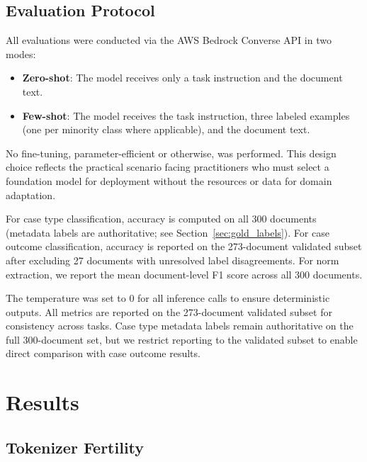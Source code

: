 \documentclass[11pt,a4paper]{article}
\begin{document}
\subsection{Evaluation Protocol}
\label{sec:protocol}

All evaluations were conducted via the AWS Bedrock Converse API in two modes:

\begin{itemize}[leftmargin=*]
    \item \textbf{Zero-shot}: The model receives only a task instruction and the document text.
    \item \textbf{Few-shot}: The model receives the task instruction, three labeled examples (one per minority class where applicable), and the document text.
\end{itemize}

No fine-tuning, parameter-efficient or otherwise, was performed. This design choice reflects the practical scenario facing practitioners who must select a foundation model for deployment without the resources or data for domain adaptation.

For case type classification, accuracy is computed on all 300 documents (metadata labels are authoritative; see Section~\ref{sec:gold_labels}). For case outcome classification, accuracy is reported on the 273-document validated subset after excluding 27 documents with unresolved label disagreements. For norm extraction, we report the mean document-level F1 score across all 300 documents.

The temperature was set to 0 for all inference calls to ensure deterministic outputs. All metrics are reported on the 273-document validated subset for consistency across tasks. Case type metadata labels remain authoritative on the full 300-document set, but we restrict reporting to the validated subset to enable direct comparison with case outcome results.

\section{Results}

\subsection{Tokenizer Fertility}
\label{sec:results_fertility}
\end{document}
